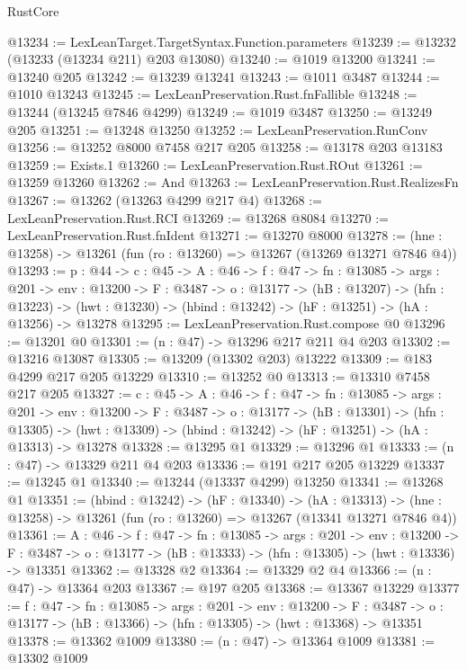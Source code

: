 \begin{lexlean}{RustCore}
\begin{coremodule}
@13234 := LexLeanTarget.TargetSyntax.Function.parameters
@13239 := @13232 (@13233 (@13234 @211) @203 @13080)
@13240 := @1019 @13200
@13241 := @13240 @205
@13242 := @13239 @13241
@13243 := @1011 @3487
@13244 := @1010 @13243
@13245 := LexLeanPreservation.Rust.fnFallible
@13248 := @13244 (@13245 @7846 @4299)
@13249 := @1019 @3487
@13250 := @13249 @205
@13251 := @13248 @13250
@13252 := LexLeanPreservation.RunConv
@13256 := @13252 @8000 @7458 @217 @205
@13258 := @13178 @203 @13183
@13259 := Exists.{1}
@13260 := LexLeanPreservation.Rust.ROut
@13261 := @13259 @13260
@13262 := And
@13263 := LexLeanPreservation.Rust.RealizesFn
@13267 := @13262 (@13263 @4299 @217 @4)
@13268 := LexLeanPreservation.Rust.RCI
@13269 := @13268 @8084
@13270 := LexLeanPreservation.Rust.fnIdent
@13271 := @13270 @8000
@13278 := (hne : @13258) -> @13261 (fun (ro : @13260) => @13267 (@13269 @13271 @7846 @4))
@13293 := {p : @44} ->
  {c : @45} ->
  {A : @46} ->
  {f : @47} ->
  {fn : @13085} ->
  {args : @201} ->
  {env : @13200} ->
  {F : @3487} ->
  {o : @13177} ->
  (hB : @13207) ->
  (hfn : @13223) -> (hwt : @13230) -> (hbind : @13242) -> (hF : @13251) -> (hA : @13256) -> @13278
@13295 := LexLeanPreservation.Rust.compose @0
@13296 := @13201 @0
@13301 := (n : @47) -> @13296 @217 @211 @4 @203
@13302 := @13216 @13087
@13305 := @13209 (@13302 @203) @13222
@13309 := @183 @4299 @217 @205 @13229
@13310 := @13252 @0
@13313 := @13310 @7458 @217 @205
@13327 := {c : @45} ->
  {A : @46} ->
  {f : @47} ->
  {fn : @13085} ->
  {args : @201} ->
  {env : @13200} ->
  {F : @3487} ->
  {o : @13177} ->
  (hB : @13301) ->
  (hfn : @13305) -> (hwt : @13309) -> (hbind : @13242) -> (hF : @13251) -> (hA : @13313) -> @13278
@13328 := @13295 @1
@13329 := @13296 @1
@13333 := (n : @47) -> @13329 @211 @4 @203
@13336 := @191 @217 @205 @13229
@13337 := @13245 @1
@13340 := @13244 (@13337 @4299) @13250
@13341 := @13268 @1
@13351 := (hbind : @13242) ->
  (hF : @13340) ->
  (hA : @13313) -> (hne : @13258) -> @13261 (fun (ro : @13260) => @13267 (@13341 @13271 @7846 @4))
@13361 := {A : @46} ->
  {f : @47} ->
  {fn : @13085} ->
  {args : @201} ->
  {env : @13200} ->
  {F : @3487} -> {o : @13177} -> (hB : @13333) -> (hfn : @13305) -> (hwt : @13336) -> @13351
@13362 := @13328 @2
@13364 := @13329 @2 @4
@13366 := (n : @47) -> @13364 @203
@13367 := @197 @205
@13368 := @13367 @13229
@13377 := {f : @47} ->
  {fn : @13085} ->
  {args : @201} ->
  {env : @13200} ->
  {F : @3487} -> {o : @13177} -> (hB : @13366) -> (hfn : @13305) -> (hwt : @13368) -> @13351
@13378 := @13362 @1009
@13380 := (n : @47) -> @13364 @1009
@13381 := @13302 @1009

\end{coremodule}
\end{lexlean}
